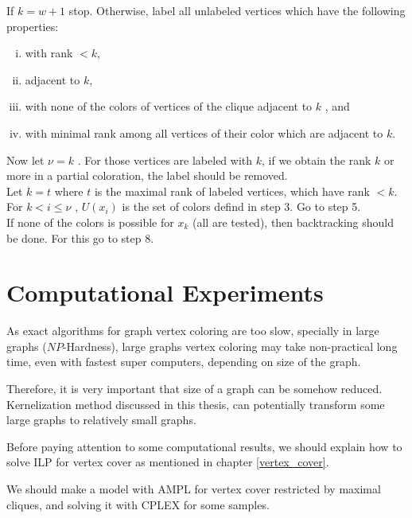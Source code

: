 \documentclass{beamer}
\begin{document}
{\begin{defi}
\begin{algorithm}[H]
{ If $k = w + 1$ stop. Otherwise, label all unlabeled vertices which have the
following properties:
\begin{enumerate}[(i)]
\item with rank $< k$,

\item adjacent to $k$,

\item with none of the colors of vertices of the clique adjacent to $k$ , and
\item with minimal rank among all vertices of their color which are adjacent
to $k$.
\end{enumerate}\newline
Now let $\nu = k$ . For those vertices are labeled with $k$, if we obtain the rank
$k$ or more in a partial coloration, the label should be removed.\\


\nl Let $k = t$ where $t$ is the maximal rank of labeled vertices, which have rank $< k$. For $k < i \leq \nu$ , $U(x_i)$ is the set of colors defind in step 3. Go to step 5.\\


\nl If none of the colors is possible for $x_k$ (all are tested), then backtracking
should be done. For this go to step 8.\\}
\end{algorithm}
\restoregeometry

\newpage


\section{Computational Experiments}\label{exp}

As exact algorithms for graph vertex coloring are too slow, specially in large 
graphs ($NP$-Hardness), large graphs vertex coloring 
may take non-practical long time, even with fastest super computers, depending on size of the graph. 

Therefore, it is very important that size of a graph can be somehow reduced. 
Kernelization method discussed in this thesis, can potentially transform some large graphs to relatively small
graphs. 

Before paying attention to some computational results, we should explain how to solve ILP for vertex cover as mentioned in chapter \ref{vertex_cover}.

We should make a model with AMPL\cite{ampl} for vertex cover restricted by
maximal cliques, and solving it with CPLEX\cite{cplex} for some samples.


\end{defi}}
\end{document}
